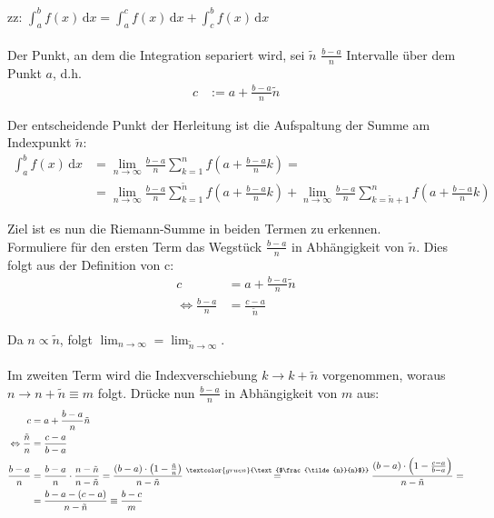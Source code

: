 \documentclass{article}
\newcommand{\diff}{\mathrm{d}}
\newcommand{\lr}[1]{\left(#1\right)}
\newcommand{\comment}[1]{\textcolor{gruen}{\text{#1}}}
\begin{document}
{\newpage


	zz: $\int_a^b f(x) \, \diff x = \int_a^c f(x) \, \diff x + \int_c^b f(x) \, \diff x$\\
	\\
	Der Punkt, an dem die Integration separiert wird, sei $\tilde{n}$ $\frac{b-a}{n}$ Intervalle über dem Punkt $a$, d.h.
		\begin{align*}
			c &:= a + \frac{b-a}{n} \tilde{n}
		\end{align*}


	Der entscheidende Punkt der Herleitung ist die Aufspaltung der Summe am Indexpunkt $\tilde{n}$:
		\begin{align*}
			\int_a^b f(x) \, \diff x &= \lim_{n\to\infty} \frac{b-a}{n} \sum_{k=1}^n f\lr{ a + \frac{b-a}{n}k } = \\
			&= \lim_{n\to\infty} \frac{b-a}{n} \sum_{k=1}^{\tilde{n}} f\lr{ a + \frac{b-a}{n}k } + \lim_{n\to\infty} \frac{b-a}{n} \sum_{k=\tilde{n}+1}^n f\lr{ a + \frac{b-a}{n}k }
		\end{align*}

	Ziel ist es nun die Riemann-Summe in beiden Termen zu erkennen.\\
	Formuliere für den ersten Term das Wegstück $\frac{b-a}{n}$ in Abhängigkeit von $\tilde{n}$. Dies folgt aus der Definition von c:
		\begin{align*}
			c &= a + \frac{b-a}{n}\tilde{n} \\
			\Leftrightarrow \frac{b-a}{n} &= \frac{c-a}{\tilde{n}}
		\end{align*}
	
	Da $n\propto \tilde{n}$, folgt $\lim_{n\to\infty} = \lim_{\tilde{n}\to\infty}$.\\
	\\
	Im zweiten Term wird die Indexverschiebung $k\to k+\tilde{n}$ vorgenommen, woraus $n\to n+\tilde{n} \equiv m$ folgt. Drücke nun $\frac{b-a}{n}$ in Abhängigkeit von $m$ aus:
		\begin{align*}
			c &= a + \frac{b-a}{n}\tilde{n} \\
			\Leftrightarrow \frac{\tilde{n}}{n} &= \frac{c-a}{b-a} \\
			\frac{b-a}{n} &= \frac{b-a}{n} \cdot \frac{n-\tilde{n}}{n-\tilde{n}} = \frac{\lr{b-a} \cdot \lr{ 1 - \frac{\tilde{n}}{n} }}{n-\tilde{n}} \stackrel{\comment{$\frac{\tilde{n}}{n}$}}{=} \frac{(b-a) \cdot \lr{ 1 - \frac{c-a}{b-a}}}{n-\tilde{n}} = \\ 				&= \frac{b-a - (c-a)}{n-\tilde{n}} \equiv \frac{b-c}{m}
		\end{align*}
	
}
\end{document}
